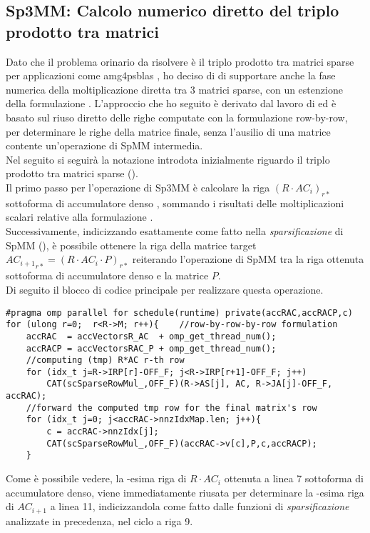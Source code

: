 \subsection{Sp3MM: Calcolo numerico diretto del triplo prodotto tra matrici} \label{chSpMMNum:directProduct}
Dato che il problema orinario da risolvere è il triplo prodotto tra matrici sparse per applicazioni come 
amg4psblas \cite{AMG4PSBLAS}, ho deciso di di supportare anche 
la fase numerica della moltiplicazione diretta tra 3 matrici sparse, con un estenzione della formulazione \rowbyrow.
\voidLine
L'approccio che ho seguito è derivato dal lavoro di \cite{Sp3MM4AMG} 
ed è basato sul riuso diretto delle righe computate con la formulazione row-by-row,
per determinare le righe della matrice finale, senza l'ausilio di una matrice contente un'operazione di SpMM intermedia.\\ 
Nel seguito si seguirà la notazione introdota inizialmente riguardo il triplo prodotto tra matrici sparse ().\\
Il primo passo per l'operazione di Sp3MM è calcolare la riga $\left( R \cdot AC_i \right)_{r*}$ 
sottoforma di accumulatore denso , sommando i risultati delle moltiplicazioni scalari relative alla formulazione \rowbyrow.\\
Successivamente, indicizzando  esattamente come fatto nella \emph{sparsificazione} di SpMM (),
è possibile ottenere la riga della matrice target ${AC_{i+1}}_{r*} = \left(R\cdot AC_i\cdot P\right)_{r*}$ 
reiterando l'operazione di SpMM tra la riga ottenuta sottoforma di accumulatore denso e la matrice $P$.\\
Di seguito il blocco di codice principale per realizzare questa operazione.\\
\begin{lstlisting}
#pragma omp parallel for schedule(runtime) private(accRAC,accRACP,c)
for (ulong r=0;  r<R->M; r++){    //row-by-row-by-row formulation
    accRAC  = accVectorsR_AC  + omp_get_thread_num();
    accRACP = accVectorsRAC_P + omp_get_thread_num();
    //computing (tmp) R*AC r-th row
    for (idx_t j=R->IRP[r]-OFF_F; j<R->IRP[r+1]-OFF_F; j++)
        CAT(scSparseRowMul_,OFF_F)(R->AS[j], AC, R->JA[j]-OFF_F, accRAC);
    //forward the computed tmp row for the final matrix's row
    for (idx_t j=0; j<accRAC->nnzIdxMap.len; j++){
        c = accRAC->nnzIdx[j];    
        CAT(scSparseRowMul_,OFF_F)(accRAC->v[c],P,c,accRACP);
    }
\end{lstlisting}
Come è possibile vedere, la -esima riga di $R\cdot AC_i$ ottenuta a linea 7 sottoforma di accumulatore denso,
viene immediatamente riusata per determinare la -esima riga di $AC_{i+1}$ a linea 11,
indicizzandola come fatto dalle funzioni di \emph{sparsificazione} analizzate in precedenza,
nel ciclo a riga 9.\\
